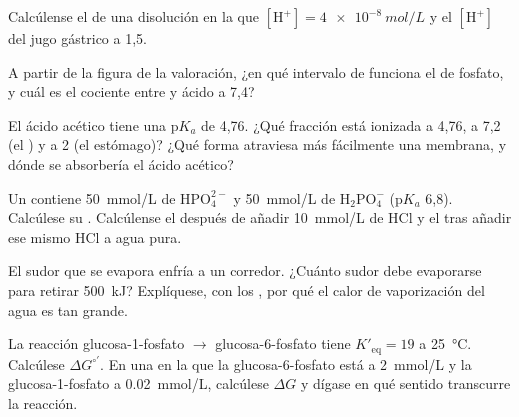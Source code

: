 \begin{exercise}[$\star$]\label{exo:b1:water-small-molecules:3}
Calcúlense el  de una disolución en la que
$[\mathrm{H^+}] = \qty{4e-8}{mol/L}$ y el $[\mathrm{H^+}]$ del jugo gástrico
a  1,5.
\end{exercise}

\begin{exercise}[$\star$]\label{exo:b1:water-small-molecules:4}
A partir de la figura de la valoración, ¿en qué intervalo de  funciona el
 de fosfato, y cuál es el cociente entre  y ácido a  7,4?
\end{exercise}

\begin{exercise}[$\star\star$]\label{exo:b1:water-small-molecules:5}
El ácido acético tiene una p$K_a$ de 4,76. ¿Qué fracción está ionizada a 
4,76, a  7,2 (el ) y a  2 (el estómago)? ¿Qué forma atraviesa más
fácilmente una membrana, y dónde se absorbería el ácido acético?
\end{exercise}

\begin{exercise}[$\star\star$]\label{exo:b1:water-small-molecules:6}
Un  contiene \qty{50}{mmol/L} de $\mathrm{HPO_4^{2-}}$ y
\qty{50}{mmol/L} de $\mathrm{H_2PO_4^-}$ (p$K_a$ 6,8). Calcúlese su .
Calcúlense el  después de añadir \qty{10}{mmol/L} de HCl y el  tras
añadir ese mismo HCl a agua pura.
\end{exercise}

\begin{exercise}[$\star\star$]\label{exo:b1:water-small-molecules:7}
El sudor que se evapora enfría a un corredor. ¿Cuánto sudor debe evaporarse
para retirar \qty{500}{kJ}? Explíquese, con los , por
qué el calor de vaporización del agua es tan grande.
\end{exercise}

\begin{exercise}[$\star\star$]\label{exo:b1:water-small-molecules:8}
La reacción glucosa-1-fosfato $\to$ glucosa-6-fosfato tiene
$K'_{\text{eq}} = 19$ a \qty{25}{\celsius}. Calcúlese
$\Delta G^{\circ\prime}$. En una  en la que la glucosa-6-fosfato está
a \qty{2}{mmol/L} y la glucosa-1-fosfato a \qty{0.02}{mmol/L}, calcúlese
$\Delta G$ y dígase en qué sentido transcurre la reacción.
\end{exercise}

